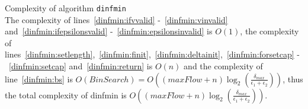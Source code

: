 \begin{sepproof}{Complexity of algorithm \texttt{dinfmin}} \ \\
   The complexity of lines~\ref{dinfmin:ifvvalid} -~\ref{dinfmin:vinvalid} and~\ref{dinfmin:ifepsilonsvalid}
   -~\ref{dinfmin:epsilonsinvalid} is $O\left(1\right)$, the complexity of
   lines~\ref{dinfmin:setlength},~\ref{dinfmin:finit},~\ref{dinfmin:deltainit},~\ref{dinfmin:forsetcap}
   -~\ref{dinfmin:setcap} and~\ref{dinfmin:return} is $O\left(n\right)$ and the complexity of line~\ref{dinfmin:bs} is
   $O\left(BinSearch\right) = O\left(\left(maxFlow + n\right) \log_2\left(\frac{\delta_{max}}{\epsilon_1 +
   \epsilon_2}\right)\right)$, thus the total complexity of dinfmin is $O\left(\left(maxFlow +
   n\right)\log_2\left(\frac{\delta_{max}}{\epsilon_1 + \epsilon_2}\right)\right)$.
\end{sepproof}
